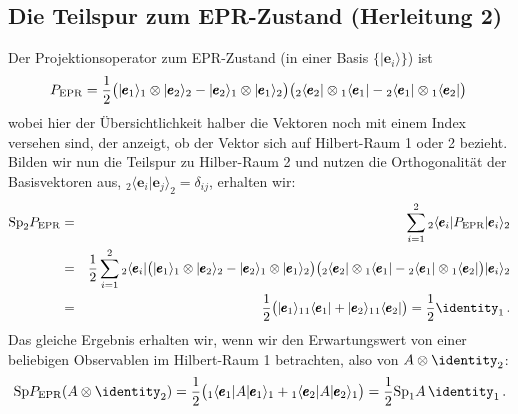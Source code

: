 \subsection*{Die Teilspur zum EPR-Zustand (Herleitung 2)}
\label{sec_EPR_B}

Der Projektionsoperator zum EPR-Zustand (in einer Basis $\{ |\pmb{e}_i\rangle\}$)
ist
\begin{equation}
    P_{\rm EPR} =  \frac{1}{2} 
        \big( | \pmb{e}_1 \rangle_1 \otimes | \pmb{e}_2 \rangle_2 - 
        | \pmb{e}_2 \rangle_1 \otimes | \pmb{e}_1 \rangle_2 \big) 
         \big( {}_2\langle \pmb{e}_2 | \otimes {}_1\langle \pmb{e}_1 | - 
        {}_2\langle \pmb{e}_1 | \otimes {}_1\langle \pmb{e}_2 | \big) \,
\end{equation}
wobei hier der \"Ubersichtlichkeit halber die Vektoren noch mit einem
Index versehen sind, der anzeigt, ob der Vektor sich auf Hilbert-Raum 1 oder
2 bezieht. Bilden wir nun die Teilspur zu Hilber-Raum 2 und nutzen die
Orthogonalit\"at der Basisvektoren aus, 
$ {}_2 \langle \pmb{e}_i | \pmb{e}_j \rangle_2 = \delta_{ij}$, 
erhalten wir:
\begin{eqnarray}
   {\rm Sp}_2 P_{\rm EPR} 
    &=& \sum_{i=1}^2  {}_2\langle \pmb{e}_i | P_{\rm EPR} | \pmb{e}_i \rangle_2  \\
    &=&  \frac{1}{2}  \sum_{i=1}^2 {}_2\langle \pmb{e}_i |
        \big( | \pmb{e}_1 \rangle_1 \otimes | \pmb{e}_2 \rangle_2 - 
        | \pmb{e}_2 \rangle_1 \otimes | \pmb{e}_1 \rangle_2 \big) 
         \big( {}_2\langle \pmb{e}_2 | \otimes {}_1\langle \pmb{e}_1 | - 
        {}_2\langle \pmb{e}_1 | \otimes {}_1\langle \pmb{e}_2 | \big) |\pmb{e}_i \rangle_2  \\
     &=&   \frac{1}{2}    
     \big( | \pmb{e}_1 \rangle_1 {}_1 \langle \pmb{e}_1 | + | \pmb{e}_2 \rangle_1 {}_1 \langle \pmb{e}_2 | \big)
      = \frac{1}{2} \identity_1 \, .
\end{eqnarray}
Das gleiche Ergebnis erhalten wir, wenn wir den Erwartungswert von einer
beliebigen Observablen im Hilbert-Raum 1 betrachten, also von $A \otimes \identity_2$:
\begin{equation}
    {\rm Sp} P_{\rm EPR} (A \otimes \identity_2) 
    = \frac{1}{2} \big( {}_1 \langle \pmb{e}_1 | A | \pmb{e}_1 \rangle_1 +  
                {}_1 \langle \pmb{e}_2 | A | \pmb{e}_2 \rangle_1 \big)  =  \frac{1}{2} {\rm Sp}_1 A\, \identity_1 \, . 
\end{equation}



